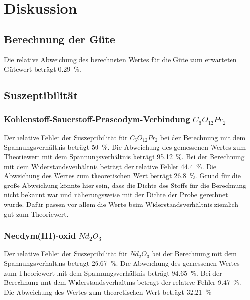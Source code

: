 \section{Diskussion}
\label{sec:Diskussion}

\subsection{Berechnung der Güte}
Die relative Abweichung des berechneten Wertes für die Güte zum erwarteten Gütewert beträgt \SI{0.29}{\percent}. 

\subsection{Suszeptibilität}
\subsubsection{Kohlenstoff-Sauerstoff-Praseodym-Verbindung $C_6 O_{12} Pr_2$}
Der relative Fehler der Suszeptibilität für $C_6 O_{12} Pr_2$ bei der Berechnung mit dem Spannungsverhältnis beträgt \SI{50}{\percent}. 
Die Abweichung des gemessenen Wertes zum Theoriewert mit dem Spannungsverhältnis beträgt \SI{95.12}{\percent}.
\newline
Bei der Berechnung mit dem Widerstandsverhältnis beträgt der relative Fehler \SI{44.4}{\percent}.
Die Abweichung des Wertes zum theoretischen Wert beträgt \SI{26.8}{\percent}.
\newline
Grund für die große Abweichung könnte hier sein, dass die Dichte des Stoffs für die Berechnung nicht bekannt war und 
näherungsweise mit der Dichte der Probe gerechnet wurde. 
Dafür passen vor allem die Werte beim Widerstandsverhältnis ziemlich gut zum Theoriewert.

\subsubsection{Neodym(III)-oxid $Nd_2 O_3$}
Der relative Fehler der Suszeptibilität für $Nd_2 O_3$ bei der Berechnung mit dem Spannungsverhältnis beträgt \SI{26.67}{\percent}. 
Die Abweichung des gemessenen Wertes zum Theoriewert mit dem Spannungsverhältnis beträgt \SI{94.65}{\percent}.
\newline
Bei der Berechnung mit dem Widerstandsverhältnis beträgt der relative Fehler \SI{9.47}{\percent}.
Die Abweichung des Wertes zum theoretischen Wert beträgt \SI{32.21}{\percent}.

